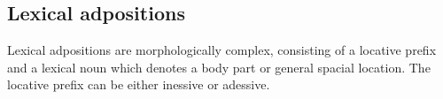 
%
%
%


%
%
%



\subsection{Lexical adpositions}\label{sec:ch13:lexical} 

Lexical adpositions are morphologically complex, consisting of a locative prefix and a lexical noun which denotes a body part or general spacial location. The locative prefix can be either inessive or adessive. 

